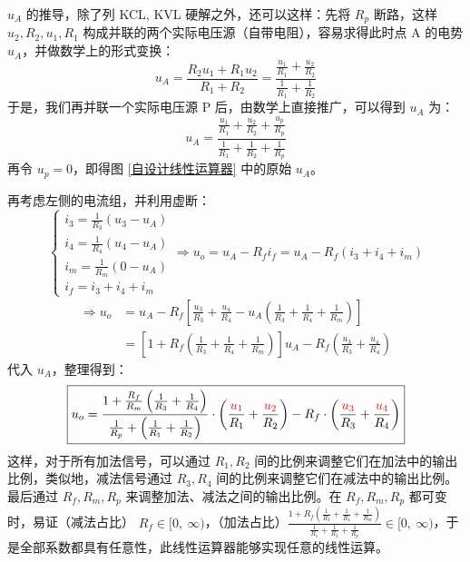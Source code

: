 \documentclass[a4paper]{article}  %
\theoremstyle{MyLineTheoremStyle} %
\theoremstyle{MyBlockTheoremStyle} %
\theoremstyle{MySubsubsectionStyle} %
\renewcommand{\small}{\fontsize{5pt}{3.5pt}\selectfont}
\begin{document}
\begin{multicols*}{4}
{\par\color{gray}\small
$u_A$ 的推导，除了列 KCL, KVL 硬解之外，还可以这样：先将 $R_p$ 断路，这样 $u_2, R_2, u_1, R_1$ 构成并联的两个实际电压源（自带电阻），容易求得此时点 A 的电势 $u_A$，并做数学上的形式变换：
\begin{equation}
u_A = \frac{R_2u_1 + R_1u_2}{R_1+R_2} =\frac{\frac{u_1}{R_1} + \frac{u_2}{R_2}}{\frac{1}{R_1} + \frac{1}{R_2} }
\end{equation}
于是，我们再并联一个实际电压源 P 后，由数学上直接推广，可以得到 $u_A$ 为：
\begin{equation}
u_A = \frac{\frac{u_1}{R_1} + \frac{u_2}{R_2} + \frac{u_p}{R_p}}{\frac{1}{R_1} + \frac{1}{R_2} + \frac{1}{R_p}}
\end{equation}
再令 $u_p = 0$，即得图 \ref{自设计线性运算器} 中的原始 $u_A$。
\par}

再考虑左侧的电流组，并利用虚断：
\begin{equation}
\begin{cases}
    i_3 = \frac{1}{R_3}(u_3 - u_A) \\ 
    i_4 = \frac{1}{R_4}(u_4 - u_A) \\ 
    i_m = \frac{1}{R_m}(0 - u_A) \\ 
    i_f = i_3 + i_4 + i_m
\end{cases}
\Longrightarrow 
u_o = u_A - R_fi_f = u_A - R_f\left( i_3 + i_4 + i_m \right)
\end{equation}
\begin{align}
\Longrightarrow
u_o &=u_A - R_f \left[ 
\frac{u_3}{R_3} + \frac{u_4}{R_4} - u_A\left( \frac{1}{R_3} + \frac{1}{R_4} + \frac{1}{R_m} \right)
\right] \\ 
&=
\left[1 + R_f \left(\frac{1}{R_3} + \frac{1}{R_4} + \frac{1}{R_m} \right)\right] u_A - R_f \left( \frac{u_3}{R_3} + \frac{u_4}{R_4} \right) 
\end{align}
代入 $u_A$，整理得到：
\begin{equation}
\boxed{
u_o= \frac{1 + \frac{R_f}{R_m} \left(\frac{1}{R_3} + \frac{1}{R_4}  \right)}{ \frac{1}{R_p} + \left(\frac{1}{R_1} + \frac{1}{R_2} \right)}\cdot \left( \frac{{\color{red} u_1}}{R_1} + \frac{{\color{red} u_2}}{R_2} \right) - R_f \cdot \left( \frac{{\color{red} u_3}}{R_3} + \frac{{\color{red} u_4}}{R_4} \right)
}
\end{equation}
这样，对于所有加法信号，可以通过 $R_1, R_2$ 间的比例来调整它们在加法中的输出比例，类似地，减法信号通过 $R_3, R_4$ 间的比例来调整它们在减法中的输出比例。最后通过 $R_f, R_m, R_p$ 来调整加法、减法之间的输出比例。在 $R_f, R_m, R_p$ 都可变时，易证（减法占比） $R_f \in [0,\ \infty)$，（加法占比）$\frac{1 + R_f \left(\frac{1}{R_3} + \frac{1}{R_4} + \frac{1}{R_m} \right)}{\frac{1}{R_1} + \frac{1}{R_2} + \frac{1}{R_p}} \in [0,\ \infty)$，于是全部系数都具有任意性，此线性运算器能够实现任意的线性运算。


\end{multicols*}
\end{document}
